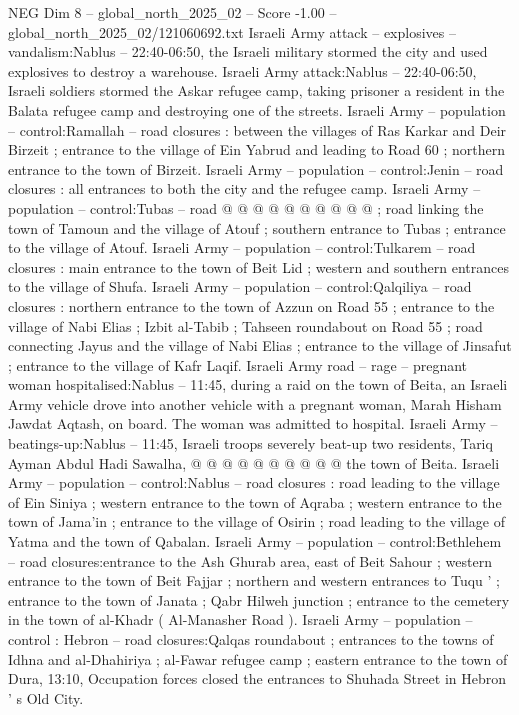 \begin{textsample}{NEG Dim 8 – global\_north\_2025\_02 – Score -1.00 – global\_north\_2025\_02/121060692.txt}
Israeli Army attack -- explosives -- vandalism:Nablus -- 22:40-06:50, the Israeli military stormed the city and used explosives to destroy a warehouse.
Israeli Army attack:Nablus -- 22:40-06:50, Israeli soldiers stormed the Askar refugee camp, taking prisoner a resident in the Balata refugee camp and destroying one of the streets.
Israeli Army -- population -- control:Ramallah -- road closures : between the villages of Ras Karkar and Deir Birzeit ; entrance to the village of Ein Yabrud and leading to Road 60 ; northern entrance to the town of Birzeit.
Israeli Army -- population -- control:Jenin -- road closures : all entrances to both the city and the refugee camp.
Israeli Army -- population -- control:Tubas -- road @ @ @ @ @ @ @ @ @ @ ; road linking the town of Tamoun and the village of Atouf ; southern entrance to Tubas ; entrance to the village of Atouf.
Israeli Army -- population -- control:Tulkarem -- road closures : main entrance to the town of Beit Lid ; western and southern entrances to the village of Shufa.
Israeli Army -- population -- control:Qalqiliya -- road closures : northern entrance to the town of Azzun on Road 55 ; entrance to the village of Nabi Elias ; Izbit al-Tabib ; Tahseen roundabout on Road 55 ; road connecting Jayus and the village of Nabi Elias ; entrance to the village of Jinsafut ; entrance to the village of Kafr Laqif.
Israeli Army road -- rage -- pregnant woman hospitalised:Nablus -- 11:45, during a raid on the town of Beita, an Israeli Army vehicle drove into another vehicle with a pregnant woman, Marah Hisham Jawdat Aqtash, on board.
The woman was admitted to hospital.
Israeli Army -- beatings-up:Nablus -- 11:45, Israeli troops severely beat-up two residents, Tariq Ayman Abdul Hadi Sawalha, @ @ @ @ @ @ @ @ @ @ the town of Beita.
Israeli Army -- population -- control:Nablus -- road closures : road leading to the village of Ein Siniya ; western entrance to the town of Aqraba ; western entrance to the town of Jama'in ; entrance to the village of Osirin ; road leading to the village of Yatma and the town of Qabalan.
Israeli Army -- population -- control:Bethlehem -- road closures:entrance to the Ash Ghurab area, east of Beit Sahour ; western entrance to the town of Beit Fajjar ; northern and western entrances to Tuqu ' ; entrance to the town of Janata ; Qabr Hilweh junction ; entrance to the cemetery in the town of al-Khadr ( Al-Manasher Road ).
Israeli Army -- population -- control : Hebron -- road closures:Qalqas roundabout ; entrances to the towns of Idhna and al-Dhahiriya ; al-Fawar refugee camp ; eastern entrance to the town of Dura, 13:10, Occupation forces closed the entrances to Shuhada Street in Hebron ' s Old City.

\end{textsample}
